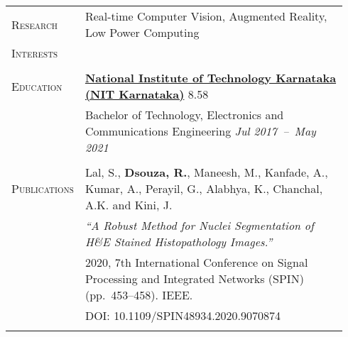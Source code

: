 \documentclass[letterpaper, 10pt, oneside]{article}
\newcommand{\stitle}[1]{\normalsize{\textsc{#1}}}
\begin{document}
\noindent \begin{longtable}{@{} p{0.14\linewidth} p{0.8\linewidth}}

    \stitle{Research}     & Real-time Computer Vision, Augmented Reality, Low Power Computing                                                        \\
    \stitle{Interests}    &                                                                                                                          \\
    \\


    \stitle{Education}    & \textbf{\href{https://nitk.ac.in}{National Institute of Technology Karnataka (NIT Karnataka)}} \hfill 8.58               \\
                          & Bachelor of Technology, Electronics and Communications Engineering \hfill \hspace{-3em} \textsl{Jul 2017\ --\ May 2021}  \\
    \\


    \stitle{Publications} & Lal, S., \textbf{Dsouza, R.}, Maneesh, M., Kanfade, A., Kumar, A., Perayil, G., Alabhya, K., Chanchal, A.K. and Kini, J. \\
                          & \textsl{``A Robust Method for Nuclei Segmentation of H\&E Stained Histopathology Images.''}                              \\
                          & 2020, 7th International Conference on Signal Processing and Integrated Networks (SPIN) (pp.~453--458)\@. IEEE\@.         \\
                          & \textcolor{dark-purple}{DOI\@: 10.1109/SPIN48934.2020.9070874}                                                           \\
    \\



\end{longtable}
\end{document}

